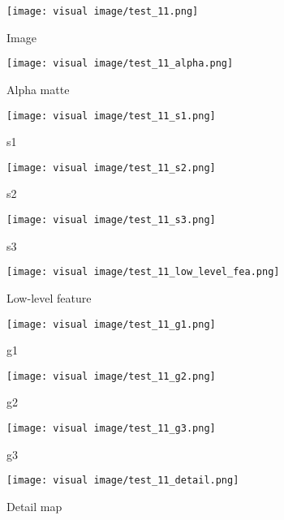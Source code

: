 \documentclass[10pt,twocolumn,letterpaper]{article}
\begin{document}
\begin{figure*}
    \centering
    \begin{subfigure}{0.19\linewidth}
        \centerline{\texttt{[image: visual image/test\_11.png]}}
        \caption{Image}
        \label{fig:test_11_image}
    \end{subfigure}
    \centering
    \begin{subfigure}{0.19\linewidth}
        \centerline{\texttt{[image: visual image/test\_11\_alpha.png]}}
        \caption{Alpha matte}
        \label{fig:test_11_image}
    \end{subfigure}
    \centering
    \begin{subfigure}{0.19\linewidth}
        \centerline{\texttt{[image: visual image/test\_11\_s1.png]}}
        \caption{s1}
        \label{fig:test_11_s1}
    \end{subfigure}
    \centering
    \begin{subfigure}{0.19\linewidth}
        \centerline{\texttt{[image: visual image/test\_11\_s2.png]}}
        \caption{s2}
        \label{fig:test_11_s2}
    \end{subfigure}
    \centering
    \begin{subfigure}{0.19\linewidth}
        \centerline{\texttt{[image: visual image/test\_11\_s3.png]}}
        \caption{s3}
        \label{fig:test_11_s3}
    \end{subfigure}
    \centering
    \begin{subfigure}{0.19\linewidth}
        \centerline{\texttt{[image: visual image/test\_11\_low\_level\_fea.png]}}
        \caption{Low-level feature}
        \label{fig:test_11_low_level_fea}
    \end{subfigure}
    \centering
    \begin{subfigure}{0.19\linewidth}
        \centerline{\texttt{[image: visual image/test\_11\_g1.png]}}
        \caption{g1}
        \label{fig:test_11_g1}
    \end{subfigure}
    \centering
    \begin{subfigure}{0.19\linewidth}
        \centerline{\texttt{[image: visual image/test\_11\_g2.png]}}
        \caption{g2}
        \label{fig:test_11_g2}
    \end{subfigure}
    \centering
    \begin{subfigure}{0.19\linewidth}
        \centerline{\texttt{[image: visual image/test\_11\_g3.png]}}
        \caption{g3}
        \label{fig:test_11_g3}
    \end{subfigure}
    \centering
    \begin{subfigure}{0.19\linewidth}
        \centerline{\texttt{[image: visual image/test\_11\_detail.png]}}
        \caption{Detail map}
        \label{fig:test_11_detail}
    \end{subfigure}



\end{figure*}
\end{document}
